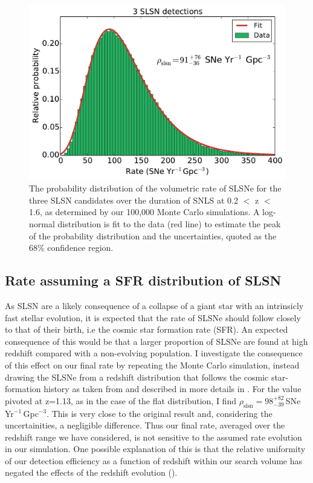 \begin{figure}
\includegraphics[scale=0.5]{Figures/Chapter3/rateFlat3}
\caption{The probability distribution of the volumetric rate of SLSNe for the three SLSN candidates over the duration of SNLS at 0.2 $<$ z $<$ 1.6, as determined by our 100,000 Monte Carlo simulations. A log-normal distribution is fit to the data (red line) to estimate the peak of the probability distribution and the uncertainties, quoted as the 68\% confidence region.}
\label{fig:rateFlat3}
\end{figure}

\subsection{Rate assuming a SFR distribution of SLSN}
\label{sec:SFRRate}
As SLSN are a likely consequence of a collapse of a giant star with an intrinsicly fast stellar evolution, it is expected that the rate of SLSNe should follow closely to that of their birth, i.e the cosmic star formation rate (SFR). An expected consequence of this would be that a larger proportion of SLSNe are found at high redshift compared with a non-evolving population. I investigate the consequence of this effect on our final rate by repeating the Monte Carlo simulation, instead drawing the SLSNe from a redshift distribution that follows the cosmic star-formation history as taken from \citet{2006ApJ...651..142H} and described in more details in . For the value pivoted at z=1.13, as in the case of the flat distribution, I find $\rho_{\mathrm{slsn}} = 98^{+82}_{-39}$\,SNe\,Yr$^{-1}$\,Gpc$^{-3}$. This is very close to the original result and, considering the uncertainities, a negligible difference. Thus our final rate, averaged over the redshift range we have considered, is not sensitive to the assumed rate evolution in our simulation. One possible explanation of this is that the relative uniformity of our detection efficiency as a function of redshift within our search volume has negated the effects of the redshift evolution ().

